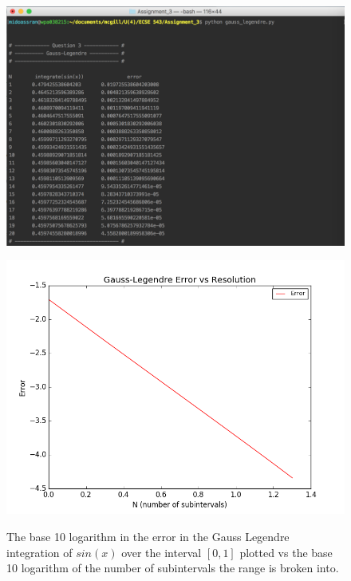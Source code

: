\documentclass[11pt]{article}
\begin{document}
\begin{figure}[!hbp]
	\begin{center}
		\begin{minipage}{ 0.7\textwidth}
			\includegraphics[width= \textwidth]{o_GL_sin.png}\\
		\end{minipage}
		\begin{minipage}{ \textwidth}
			\includegraphics[width=\textwidth]{GL_sin.png}\\
		\end{minipage}
		\caption{\label{fig:GL_sin}The base 10 logarithm in the error in the Gauss Legendre integration of $sin(x)$ over the interval $[0,1]$ plotted vs the base 10 logarithm of the number of subintervals the range is broken into.}
	\end{center}
\end{figure}
\end{document}
